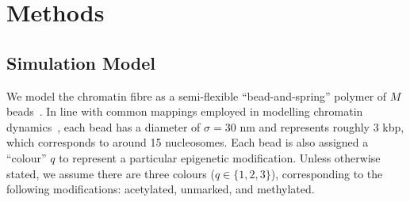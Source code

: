 \documentclass[12pt]{article}
\begin{document}
\section{Methods}
\subsection{Simulation Model}
We model the chromatin fibre as a semi-flexible ``bead-and-spring'' polymer of $M$ beads~\cite{kremer1990}. In line with common mappings employed in modelling chromatin dynamics~\cite{rosa2008, mirny2011, brackley2016, michieletto2016}, each bead has a diameter of $\sigma = 30$ nm and represents roughly 3 kbp, which corresponds to around 15 nucleosomes. Each bead is also assigned a ``colour'' $q$ to represent a particular epigenetic modification. Unless otherwise stated, we assume there are three colours ($q \in \{1, 2, 3\}$), corresponding to the following modifications: acetylated, unmarked, and methylated. 
\end{document}
